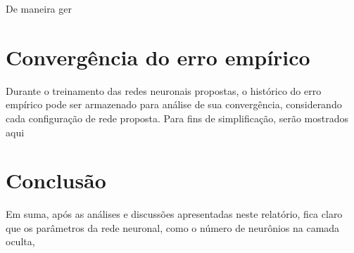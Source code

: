 \documentclass{article}
\begin{document}
De maneira ger

\section{Convergência do erro empírico}

Durante o treinamento das redes neuronais propostas, o histórico do erro empírico pode ser armazenado para análise de sua convergência, considerando cada configuração de rede proposta. Para fins de simplificação, serão mostrados
aqui

\section{Conclusão}

Em suma, após as análises e discussões apresentadas neste relatório, fica claro que os parâmetros da rede neuronal, como o número de neurônios na camada oculta,
\end{document}
